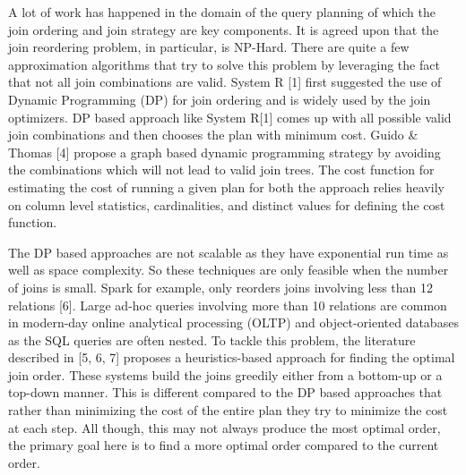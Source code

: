 A lot of work has happened in the domain of the query planning of which the join ordering and join strategy are key components. It is agreed upon that the join reordering problem, in particular, is NP-Hard. There are quite a few approximation algorithms that try to solve this problem by leveraging the fact that not all join combinations are valid. System R [1] first suggested the use of Dynamic Programming (DP) for join ordering and is widely used by the join optimizers. DP based approach like System R[1] comes up with all possible valid join combinations and then chooses the plan with minimum cost. Guido & Thomas [4] propose a graph based dynamic programming strategy by avoiding the combinations which will not lead to valid join trees. The cost function for estimating the cost of running a given plan for both the approach relies heavily on column level statistics, cardinalities, and distinct values for defining the cost function.

The DP based approaches are not scalable as they have exponential run time as well as space complexity. So these techniques are only feasible when the number of joins is small. Spark for example, only reorders joins involving less than 12 relations [6]. Large ad-hoc queries involving more than 10 relations are common in modern-day online analytical processing (OLTP) and object-oriented databases as the SQL queries are often nested. To tackle this problem,  the literature described in [5, 6, 7] proposes a heuristics-based approach for finding the optimal join order. These systems build the joins greedily either from a bottom-up or a top-down manner. This is different compared to the DP based approaches that rather than minimizing the cost of the entire plan they try to minimize the cost at each step. All though, this may not always produce the most optimal order, the primary goal here is to find a more optimal order compared to the current order.

